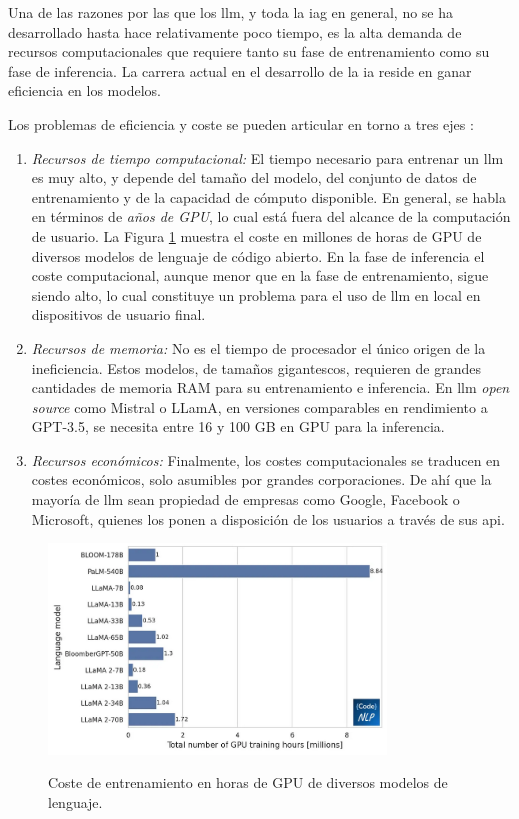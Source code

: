 Una de las razones por las que los \gls{llm}, y toda la \gls{iag} en general, no se ha desarrollado hasta hace relativamente poco tiempo, es la alta demanda de recursos computacionales que requiere tanto su fase de entrenamiento como su fase de inferencia. La carrera actual en el desarrollo de la \gls{ia} reside en ganar eficiencia en los modelos. 

Los problemas de eficiencia y coste se pueden articular en torno a tres ejes \citep{arunbijiRAGVsFinetuning}:

\begin{enumerate}[label=\alph*)]
    \item \textit{Recursos de tiempo computacional:} El tiempo necesario para entrenar un \gls{llm} es muy alto, y depende del tamaño del modelo, del conjunto de datos de entrenamiento y de la capacidad de cómputo disponible. En general, se habla en términos de \emph{años de GPU}, lo cual está fuera del alcance de la computación de usuario. La Figura \ref{fig:llm_gpu_training_hours} muestra el coste en millones de horas de GPU de diversos modelos de lenguaje de código abierto. En la fase de inferencia el coste computacional, aunque menor que en la fase de entrenamiento, sigue siendo alto, lo cual constituye un problema para el uso de \gls{llm} en local en dispositivos de usuario final.
    \item \textit{Recursos de memoria:} No es el tiempo de procesador el único origen de la ineficiencia. Estos modelos, de tamaños gigantescos, requieren de grandes cantidades de memoria RAM para su entrenamiento e inferencia. En \gls{llm} \emph{open source} como Mistral o LLamA, en versiones comparables en rendimiento a GPT-3.5, se necesita entre 16 y 100 GB en GPU para la inferencia. 
    \item \textit{Recursos económicos:} Finalmente, los costes computacionales se traducen en costes económicos, solo asumibles por grandes corporaciones. De ahí que la mayoría de \gls{llm} sean propiedad de empresas como Google, Facebook o Microsoft, quienes los ponen a disposición de los usuarios a través de sus \gls{api}.
\end{enumerate}

\begin{figure}[H]
    \caption[Coste de entrenamiento en horas de GPU de diversos modelos de lenguaje]{Coste de entrenamiento en horas de GPU de diversos modelos de lenguaje.}
    \centering
    \includegraphics[width=0.8\textwidth]{./figuras/llm_gpu_training_hours.png}
    \label{fig:llm_gpu_training_hours}
  \end{figure}

